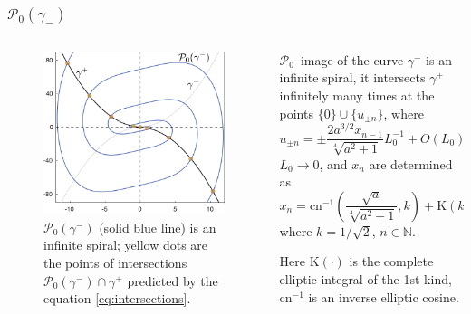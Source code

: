 \documentclass [10pt] {beamer}
\begin{document}
\begin{frame}
	\frametitle{$\mathcal{P}_0(\gamma_-)$}
	\begin{columns}[T]
		\begin{column}{.5\textwidth}
			\begin{figure}
			\includegraphics[width = 1\textwidth]{pic/map-of-separatrix.pdf}
			\caption{$\mathcal{P}_0(\gamma^-)$ (solid blue line) is an infinite spiral; yellow dots are the points of intersections $\mathcal{P}_0(\gamma^-) \cap \gamma^+$ predicted by the equation \eqref{eq:intersections}.}
			\label{pic:map-of-separatrix}
			\end{figure}
		\end{column}
		\begin{column}{.5\textwidth}
			\begin{theorem}
				$\mathcal{P}_0$--image of the curve $\gamma^-$ is an infinite spiral, it intersects $\gamma^+$ infinitely many times at the points $\{0\} \cup \{u_{\pm n}\}$, where
				\begin{equation}
					u_{\pm n} = \pm \dfrac{2 a^{3/2} x_{n - 1}}{\sqrt[4]{a^2 + 1}} L_0^{
					-1} + O(L_0);
					\label{eq:intersections}
				\end{equation}
				$L_0  \to 0$, and $x_n$ are determined as
				\begin{equation*}
					x_n = \textrm{cn}^{-1} \left(\dfrac{\sqrt{a}}{\sqrt[4]{a^2 + 1}}, k\right) + \textrm{K}(k)n,
				\end{equation*}
				where $k = 1/\sqrt{2}$, $n \in \mathbb{N}$.
			\end{theorem}
			
			Here $\textrm{K}(\cdotp)$ is the complete elliptic integral of the 1st kind, $\textrm{cn}^{-1}$ is an inverse elliptic cosine.
		\end{column}
	\end{columns}
\end{frame}
\end{document}
